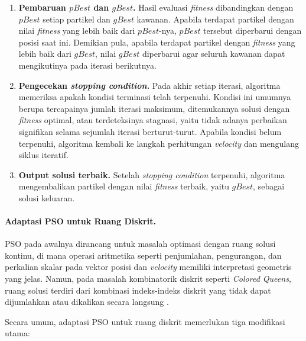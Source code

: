 \begin{enumerate}
	\item \textbf{Pembaruan $pBest$ dan $gBest$.} Hasil evaluasi \textit{fitness} dibandingkan dengan $pBest$ setiap partikel dan $gBest$ kawanan. Apabila terdapat partikel dengan nilai \textit{fitness} yang lebih baik dari $pBest$-nya, $pBest$ tersebut diperbarui dengan posisi saat ini. Demikian pula, apabila terdapat partikel dengan \textit{fitness} yang lebih baik dari $gBest$, nilai $gBest$ diperbarui agar seluruh kawanan dapat mengikutinya pada iterasi berikutnya.
	
	\item \textbf{Pengecekan \textit{stopping condition}.} Pada akhir setiap iterasi, algoritma memeriksa apakah kondisi terminasi telah terpenuhi. Kondisi ini umumnya berupa tercapainya jumlah iterasi maksimum, ditemukannya solusi dengan \textit{fitness} optimal, atau terdeteksinya stagnasi, yaitu tidak adanya perbaikan signifikan selama sejumlah iterasi berturut-turut. Apabila kondisi belum terpenuhi, algoritma kembali ke langkah perhitungan \textit{velocity} dan mengulang siklus iteratif.
	
	\item \textbf{Output solusi terbaik.} Setelah \textit{stopping condition} terpenuhi, algoritma mengembalikan partikel dengan nilai \textit{fitness} terbaik, yaitu $gBest$, sebagai solusi keluaran.
\end{enumerate}

\paragraph{Adaptasi PSO untuk Ruang Diskrit.}
\label{par:discrete-pso}

PSO pada awalnya dirancang untuk masalah optimasi dengan ruang solusi kontinu, di mana operasi aritmetika seperti penjumlahan, pengurangan, dan perkalian skalar pada vektor posisi dan \textit{velocity} memiliki interpretasi geometris yang jelas. Namun, pada masalah kombinatorik diskrit seperti \textit{Colored Queens}, ruang solusi terdiri dari kombinasi indeks-indeks diskrit yang tidak dapat dijumlahkan atau dikalikan secara langsung \cite{hu2003swarm}.

Secara umum, adaptasi PSO untuk ruang diskrit memerlukan tiga modifikasi utama:

